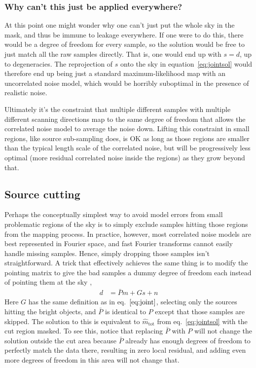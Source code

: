 \documentclass{article}
\begin{document}
\subsubsection{Why can't this just be applied everywhere?}
At this point one might wonder why one can't just put the whole sky in the mask, and
thus be immune to leakage everywhere. If one were to do this, there would be a degree of
freedom for every sample, so the solution would be free to just match all the raw samples
directly. That is, one would end up with $s = d$, up to degeneracies. The reprojection of
$s$ onto the sky in equation~\ref{eq:jointsol} would therefore end up being just a standard
maximum-likelihood map with an uncorrelated noise model, which would be horribly suboptimal
in the presence of realistic noise.

Ultimately it's the constraint that multiple different
samples with multiple different scanning directions map to the same degree of freedom that
allows the correlated noise model to average the noise down. Lifting this constraint in small
regions, like source sub-sampling does, is OK as long as those regions are smaller than the
typical length scale of the correlated noise, but will be progressively less optimal
(more residual correlated noise inside the regions) as they grow beyond that.

\subsection{Source cutting}
\label{sect:source-cut}
Perhaps the conceptually simplest way to avoid model errors from small problematic regions
of the sky is to simply exclude samples hitting those regions from the mapping process. In
practice, however, most correlated noise models are best represented in Fourier space, and fast Fourier
transforms cannot easily handle missing samples. Hence, simply dropping those samples isn't
straightforward. A trick that effectively achieves the same thing is to modify the
pointing matrix to give the bad samples a dummy degree of freedom each instead of pointing
them at the sky \citep{dunner/etal/2013},
\begin{align}
d &= \bar P m + Gs + n
\end{align}
Here $G$ has the same definition as in eq.~$\ref{eq:joint}$, selecting only the sources hitting
the bright objects, and $\bar P$ is identical to $P$ except that those samples are skipped.
The solution to this is equivalent to $\hat m_\textrm{tot}$ from eq.~\ref{eq:jointsol} with
the cut region masked. To see this, notice that replacing $\bar P$ with $P$ will not change
the solution outside the cut area because $\bar P$ already has enough degrees of freedom to
perfectly match the data there, resulting in zero local residual, and adding even more degrees of freedom
in this area will not change that.
\end{document}
